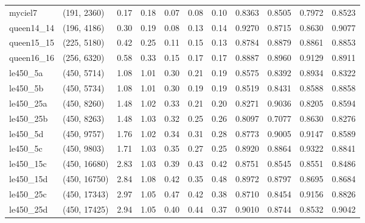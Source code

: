\begin{tabular}{llrrrrrrrrr}
   myciel7 &  (191, 2360) &  0.17 & 0.18 & 0.07 &  0.08 &   0.10 &   0.8363 &   0.8505 &     0.7972 &      0.8523 \\
queen14\_14 &  (196, 4186) &  0.30 & 0.19 & 0.08 &  0.13 &   0.14 &   0.9270 &   0.8715 &     0.8630 &      0.9077 \\
queen15\_15 &  (225, 5180) &  0.42 & 0.25 & 0.11 &  0.15 &   0.13 &   0.8784 &   0.8879 &     0.8861 &      0.8853 \\
queen16\_16 &  (256, 6320) &  0.58 & 0.33 & 0.15 &  0.17 &   0.17 &   0.8887 &   0.8960 &     0.9129 &      0.8911 \\
  le450\_5a &  (450, 5714) &  1.08 & 1.01 & 0.30 &  0.21 &   0.19 &   0.8575 &   0.8392 &     0.8934 &      0.8322 \\
  le450\_5b &  (450, 5734) &  1.08 & 1.01 & 0.30 &  0.19 &   0.19 &   0.8519 &   0.8431 &     0.8588 &      0.8858 \\
 le450\_25a &  (450, 8260) &  1.48 & 1.02 & 0.33 &  0.21 &   0.20 &   0.8271 &   0.9036 &     0.8205 &      0.8594 \\
 le450\_25b &  (450, 8263) &  1.48 & 1.03 & 0.32 &  0.25 &   0.26 &   0.8097 &   0.7077 &     0.8630 &      0.8276 \\
  le450\_5d &  (450, 9757) &  1.76 & 1.02 & 0.34 &  0.31 &   0.28 &   0.8773 &   0.9005 &     0.9147 &      0.8589 \\
  le450\_5c &  (450, 9803) &  1.71 & 1.03 & 0.35 &  0.27 &   0.25 &   0.8920 &   0.8864 &     0.9322 &      0.8841 \\
 le450\_15c & (450, 16680) &  2.83 & 1.03 & 0.39 &  0.43 &   0.42 &   0.8751 &   0.8545 &     0.8551 &      0.8486 \\
 le450\_15d & (450, 16750) &  2.84 & 1.08 & 0.42 &  0.35 &   0.48 &   0.8972 &   0.8797 &     0.8695 &      0.8684 \\
 le450\_25c & (450, 17343) &  2.97 & 1.05 & 0.47 &  0.42 &   0.38 &   0.8710 &   0.8454 &     0.9156 &      0.8826 \\
 le450\_25d & (450, 17425) &  2.94 & 1.05 & 0.40 &  0.44 &   0.37 &   0.9010 &   0.8744 &     0.8532 &      0.9042 \\
\bottomrule
\end{tabular}
